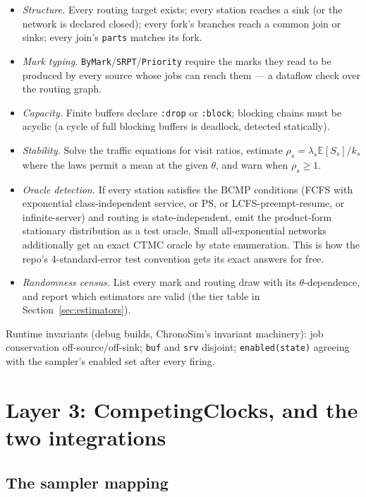 \documentclass[11pt]{article}
\newcommand{\E}{\mathbb{E}}
\newcommand{\code}[1]{\texttt{#1}}
\begin{document}
\begin{itemize}
\item[C1.] \emph{Structure.} Every routing target exists; every station
  reaches a sink (or the network is declared closed); every fork's branches
  reach a common join or sinks; every join's \code{parts} matches its fork.
\item[C2.] \emph{Mark typing.} \code{ByMark}/\code{SRPT}/\code{Priority}
  require the marks they read to be produced by every source whose jobs can
  reach them --- a dataflow check over the routing graph.
\item[C3.] \emph{Capacity.} Finite buffers declare \code{:drop} or
  \code{:block}; blocking chains must be acyclic (a cycle of full blocking
  buffers is deadlock, detected statically).
\item[C4.] \emph{Stability.} Solve the traffic equations for visit ratios,
  estimate $\rho_s = \lambda_s \E[S_s]/k_s$ where the laws permit a mean at
  the given $\theta$, and warn when $\rho_s \ge 1$.
\item[C5.] \emph{Oracle detection.} If every station satisfies the BCMP
  conditions (FCFS with exponential class-independent service, or PS, or
  LCFS-preempt-resume, or infinite-server) and routing is state-independent,
  emit the product-form stationary distribution as a test oracle. Small
  all-exponential networks additionally get an exact CTMC oracle by state
  enumeration. This is how the repo's 4-standard-error test convention gets
  its exact answers for free.
\item[C6.] \emph{Randomness census.} List every mark and routing draw with its
  $\theta$-dependence, and report which estimators are valid
  (the tier table in Section~\ref{sec:estimators}).
\end{itemize}

Runtime invariants (debug builds, ChronoSim's invariant machinery): job
conservation off-source/off-sink; \code{buf} and \code{srv} disjoint;
\code{enabled(state)} agreeing with the sampler's enabled set after every
firing.

\section{Layer 3: CompetingClocks, and the two integrations}

\subsection{The sampler mapping}
\end{document}
